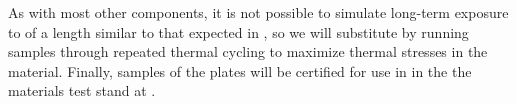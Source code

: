 As with most other components, it is not possible to simulate long-term exposure to  of a length similar to that expected in , so we will substitute by running samples through repeated thermal cycling to maximize thermal stresses in the material.  Finally, samples of the  plates will be certified for use in  in the the materials test stand at .  







%
